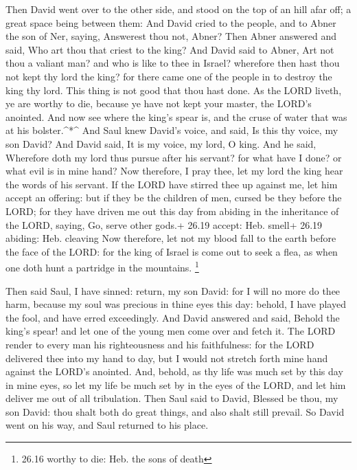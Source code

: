  Then David went over to the other side, and stood on the
top of an hill afar off; a great space being between them: 
And David cried to the people, and to Abner the son of Ner, saying,
Answerest thou not, Abner? Then Abner answered and said, Who art thou
that criest to the king?  And David said to Abner, Art not
thou a valiant man? and who is like to thee in Israel? wherefore then
hast thou not kept thy lord the king? for there came one of the people
in to destroy the king thy lord.  This thing is not good
that thou hast done. As the LORD liveth, ye are worthy to die, because
ye have not kept your master, the LORD's anointed. And now see where the
king's spear is, and the cruse of water that was at his
bolster.\^{}*\^{}  And Saul knew David's voice, and said,
Is this thy voice, my son David? And David said, It is my voice, my
lord, O king.  And he said, Wherefore doth my lord thus
pursue after his servant? for what have I done? or what evil is in mine
hand?  Now therefore, I pray thee, let my lord the king
hear the words of his servant. If the LORD have stirred thee up against
me, let him accept an offering: but if they be the children of men,
cursed be they before the LORD; for they have driven me out this day
from abiding in the inheritance of the LORD, saying, Go, serve other
gods.+ 26.19 accept: Heb. smell+ 26.19 abiding: Heb. cleaving
 Now therefore, let not my blood fall to the earth before
the face of the LORD: for the king of Israel is come out to seek a flea,
as when one doth hunt a partridge in the mountains. \footnote{26.16
  worthy to die: Heb. the sons of death}

 Then said Saul, I have sinned: return, my son David: for I
will no more do thee harm, because my soul was precious in thine eyes
this day: behold, I have played the fool, and have erred exceedingly.
 And David answered and said, Behold the king's spear! and
let one of the young men come over and fetch it.  The LORD
render to every man his righteousness and his faithfulness: for the LORD
delivered thee into my hand to day, but I would not stretch forth mine
hand against the LORD's anointed.  And, behold, as thy life
was much set by this day in mine eyes, so let my life be much set by in
the eyes of the LORD, and let him deliver me out of all tribulation.
 Then Saul said to David, Blessed be thou, my son David:
thou shalt both do great things, and also shalt still prevail. So David
went on his way, and Saul returned to his place.

